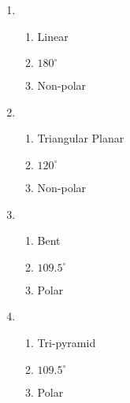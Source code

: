 \documentclass[12pt]{article}
\begin{document}
\begin{enumerate}
\begin{enumerate}

  \item {}

    \begin{enumerate}

      \item Linear

      \item $180^{\circ}$

      \item Non-polar

    \end{enumerate}

  \item {}

    \begin{enumerate}

      \item Triangular Planar

      \item $120^{\circ}$

      \item Non-polar

    \end{enumerate}

  \item {}

    \begin{enumerate}

      \item Bent

      \item $109.5^{\circ}$

      \item Polar

    \end{enumerate}

  \item {}

    \begin{enumerate}

      \item Tri-pyramid

      \item $109.5^{\circ}$

      \item Polar

    \end{enumerate}

\end{enumerate}


\end{enumerate}
\end{document}
